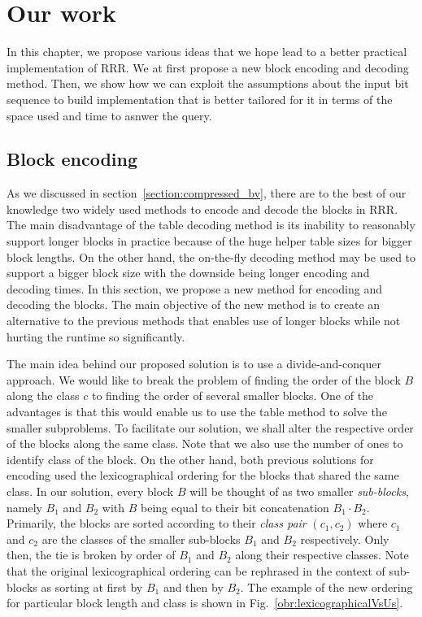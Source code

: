 \chapter{Our work}
\label{kap:kap3}

In this chapter, we propose various ideas that we hope lead to a better practical
implementation of RRR. We at first propose a new block encoding and decoding method.
Then, we show how we can exploit the assumptions about the input bit sequence to build
implementation that is better tailored for it in terms of the space used and time to
asnwer the query.

\section{Block encoding}

As we discussed in section~\ref{section:compressed_bv}, there are to
the best of our knowledge two widely used methods to encode and decode the
blocks in RRR. The main disadvantage of the table decoding method is its
inability to reasonably support longer blocks in practice because of the
huge helper table sizes for bigger block lengths. On the other hand, the on-the-fly
decoding method may be used to support a bigger block size with the downside
being longer encoding and decoding times. In this section, we propose a new
method for encoding and decoding the blocks. The main objective of the new
method is to create an alternative to the previous methods that enables use
of longer blocks while not hurting the runtime so significantly.

The main idea behind our proposed solution is to use a divide-and-conquer approach.
We would like to break the problem of finding the order of the block $B$ along
the class $c$ to finding the order of several smaller blocks. One of the advantages
is that this would enable us to use the table method to solve the smaller subproblems.
To facilitate our solution, we shall alter the respective order of the blocks along
the same class. Note that we also use the number of ones to identify class
of the block. On the other hand, both previous solutions for encoding used the lexicographical
ordering for the blocks that shared the same class. In our solution, every block $B$ will
be thought of as two smaller \textit{sub-blocks}, namely $B_1$ and $B_2$ with $B$ being equal
to their bit concatenation $B_1\cdot B_2$. Primarily, the blocks are sorted according to their
\textit{class pair} $(c_1, c_2)$ where $c_1$ and $c_2$ are the classes of the smaller sub-blocks
$B_1$ and $B_2$ respectively. Only then, the tie is broken by order of $B_1$ and $B_2$ along
their respective classes. Note that the original lexicographical ordering can be rephrased in the
context of sub-blocks as sorting at first by $B_1$ and then by $B_2$. The example of the new
ordering for particular block length and class is shown in Fig.~\ref{obr:lexicographicalVsUs}.

